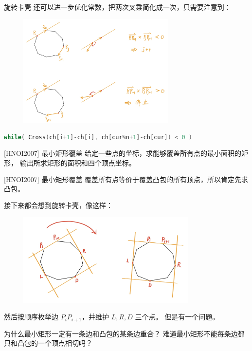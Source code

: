 \documentclass{beamer}
\begin{document}
\begin{frame}[fragile]{旋转卡壳}
    \footnotesize
    还可以进一步优化常数，把两次叉乘简化成一次，\pause 只需要注意到：
    \begin{figure}[H]
        \centering
        \includegraphics[width=0.7\textwidth]{pic/rotation_opt.jpg}
    \end{figure}
    \pause
    \begin{lstlisting}[language=c++]
while( Cross(ch[i+1]-ch[i], ch[cur%n+1]-ch[cur]) < 0 )
    \end{lstlisting}
\end{frame}

\begin{frame}{[HNOI2007] 最小矩形覆盖}
    \small
    给定一些点的坐标，求能够覆盖所有点的最小面积的矩形，
    输出所求矩形的面积和四个顶点坐标。
\end{frame}

\begin{frame}{[HNOI2007] 最小矩形覆盖}
    \footnotesize
    覆盖所有点等价于覆盖凸包的所有顶点，所以肯定先求凸包。

    \vspace{1em}\pause
    接下来都会想到旋转卡壳，像这样：
    \begin{figure}[H]
        \centering
        \includegraphics[width=0.8\textwidth]{pic/hnoi2007.jpg}
    \end{figure}
    然后按顺序枚举边 $P_{i}P_{i+1}$，并维护 $L,R,D$ 三个点。
    但是有一个问题。

    \vspace{1em}\pause
    为什么最小矩形一定有一条边和凸包的某条边重合？
    难道最小矩形不能每条边都只和凸包的一个顶点相切吗？
\end{frame}
\end{document}
